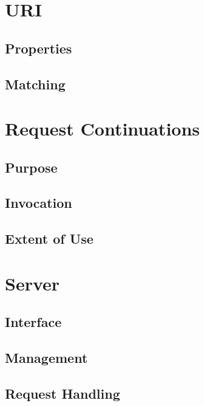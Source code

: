 \section{URI}\label{sec:uri}
\subsection{Properties}\label{sec:uri properties}
\subsection{Matching}\label{sec:uri matching}

\section{Request Continuations}\label{sec:request continuations}
\subsection{Purpose}\label{sec:req purpose}
\subsection{Invocation}\label{sec:req invocation}
\subsection{Extent of Use}\label{sec:req extent of use}

\section{Server}\label{sec:server}
\subsection{Interface}\label{sec:ser interface}
\subsection{Management}\label{sec:ser management}
\subsection{Request Handling}\label{sec:ser request handling}

